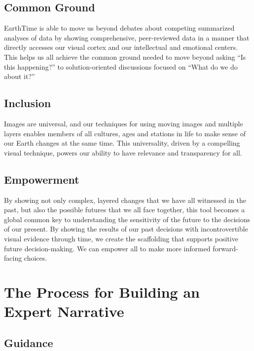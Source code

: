 \documentclass[
]{book}
\begin{document}
\hypertarget{common-ground}{%
\subsection*{Common Ground}\label{common-ground}}


EarthTime is able to move us beyond debates about competing summarized analyses of data by showing comprehensive, peer-reviewed data in a manner that directly accesses our visual cortex and our intellectual and emotional centers. This helps us all achieve the common ground needed to move beyond asking ``Is this happening?'' to solution-oriented discussions focused on ``What do we do about it?''

\hypertarget{inclusion}{%
\subsection*{Inclusion}\label{inclusion}}


Images are universal, and our techniques for using moving images and multiple layers enables members of all cultures, ages and stations in life to make sense of our Earth changes at the same time. This universality, driven by a compelling visual technique, powers our ability to have relevance and transparency for all.

\hypertarget{empowerment}{%
\subsection*{Empowerment}\label{empowerment}}


By showing not only complex, layered changes that we have all witnessed in the past, but also the possible futures that we all face together, this tool becomes a global common key to understanding the sensitivity of the future to the decisions of our present. By showing the results of our past decisions with incontrovertible visual evidence through time, we create the scaffolding that supports positive future decision-making. We can empower all to make more informed forward-facing choices.

\hypertarget{the-process-for-building-an-expert-narrative}{%
\section{The Process for Building an Expert Narrative}\label{the-process-for-building-an-expert-narrative}}

\hypertarget{guidance}{%
\subsection*{Guidance}\label{guidance}}
\end{document}
